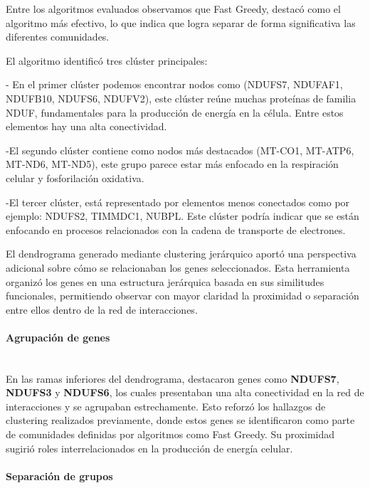 \vspace{1em}
	

Entre los algoritmos evaluados observamos que Fast Greedy, destacó como el algoritmo más efectivo, lo que indica que logra separar de forma significativa las diferentes comunidades.

El algoritmo identificó tres clúster principales:

- En el primer clúster podemos encontrar nodos como (NDUFS7, NDUFAF1, NDUFB10, NDUFS6, NDUFV2), este clúster reúne muchas proteínas de familia NDUF, fundamentales para la producción de energía en la célula. Entre estos elementos hay una alta conectividad.

-El segundo clúster contiene como nodos más destacados (MT-CO1, MT-ATP6, MT-ND6, MT-ND5), este grupo parece estar más enfocado en la respiración celular y fosforilación oxidativa.

-El tercer clúster, está representado por elementos menos conectados como por ejemplo: NDUFS2, TIMMDC1, NUBPL. Este clúster podría indicar que se están enfocando en procesos relacionados con la cadena de transporte de electrones.

El dendrograma generado mediante clustering jerárquico aportó una perspectiva adicional sobre cómo se relacionaban los genes seleccionados. Esta herramienta organizó los genes en una estructura jerárquica basada en sus similitudes funcionales, permitiendo observar con mayor claridad la proximidad o separación entre ellos dentro de la red de interacciones.

\paragraph{Agrupación de genes} \mbox{}\\

En las ramas inferiores del dendrograma, destacaron genes como \textbf{NDUFS7}, \textbf{NDUFS3} y \textbf{NDUFS6}, los cuales presentaban una alta conectividad en la red de interacciones y se agrupaban estrechamente. Esto reforzó los hallazgos de clustering realizados previamente, donde estos genes se identificaron como parte de comunidades definidas por algoritmos como Fast Greedy. Su proximidad sugirió roles interrelacionados en la producción de energía celular.

\paragraph{Separación de grupos} \mbox{}\\

